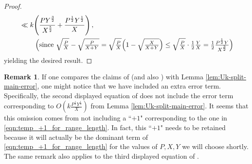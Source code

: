 \documentclass[12pt,letterpaper,reqno]{amsart}
\theoremstyle{plain}
\theoremstyle{definition}
\newtheorem{remark}[theorem]{Remark}
\numberwithin{equation}{section}
\numberwithin{figure}{section}
\numberwithin{table}{section}
\newcommand{\lrp}[1]{\!\left(#1\right)}
\begin{document}
\begin{proof}
\begin{align}
        &\ll k\lrp{\frac{PY^{\frac{3}{2}}}{X^{\frac{5}{2}}}+\frac{P^\frac{1}{2}Y^\frac{1}{2}}{X}},
        \\
        &\qquad \text{ \Big(since $\sqrt{\tfrac{P}{X}}-\sqrt{\tfrac{P}{X+Y}} = \sqrt{\tfrac{P}{X}} \Big(1 - \sqrt{\tfrac{X}{X+Y}}\Big)\leq \sqrt{\tfrac{P}{X}} \cdot \tfrac{1}{2} \tfrac{Y}{X} = \tfrac 12 \tfrac{ P^\frac{1}{2} Y}{X^\frac{3}{2}}$\Big)}
    \end{align}
    yielding the desired result.
\end{proof}

\begin{remark}
    If one compares the claims of \cite[Section 3.3.7]{Zubrilina} (and also \cite[Proposition 3.2]{Zubrilina}) with Lemma \ref{lem:Uk-split-main-error}, one might notice that we have included an extra error term. Specifically, the second displayed equation of \cite[Section 3.3.7]{Zubrilina} does not include the error term corresponding to $O\lrp{k\frac{P^\frac{1}{2} Y^\frac{1}{2}}{X}}$ from Lemma \ref{lem:Uk-split-main-error}. It seems that this omission comes from not including a ``$+1$" corresponding to the one in \eqref{eqn:temp_+1_for_range_length}. 
    In fact, this ``$+1$" needs to be retained because it will actually be the dominant term of \eqref{eqn:temp_+1_for_range_length} for the values of $P,X,Y$ we will choose shortly. The same remark also applies to the third displayed equation of \cite[Section 3.3.7]{Zubrilina}.
\end{remark}
\end{document}
